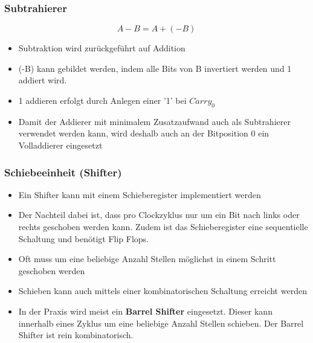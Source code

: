 \subsubsection{Subtrahierer}
\begin{equation}
A-B = A + (-B)
\end{equation}
\begin{itemize}
	\item Subtraktion wird zurückgeführt auf Addition
	\item (-B) kann gebildet werden, indem alle Bits von B invertiert werden und 1 addiert wird.
	\item 1 addieren erfolgt durch Anlegen einer '1' bei $Carry_0$
	\item Damit der Addierer mit minimalem Zusatzaufwand auch als Subtrahierer verwendet werden kann, wird deshalb auch an der Bitposition 0 ein Volladdierer eingesetzt
\end{itemize}

\subsubsection{Schiebeeinheit (Shifter)}
\begin{itemize}
	\item Ein Shifter kann mit einem Schieberegister implementiert werden
	\item Der Nachteil dabei ist, dass pro Clockzyklus nur um ein Bit nach links oder rechts geschoben werden kann. Zudem ist das Schieberegister eine sequentielle Schaltung und benötigt Flip Flops.
	\item Oft muss um eine beliebige Anzahl Stellen möglichst  in einem Schritt geschoben werden
	\item Schieben kann auch mittels einer kombinatorischen Schaltung erreicht werden
	\item In der Praxis wird meist ein \textbf{Barrel Shifter} eingesetzt. Dieser kann innerhalb eines Zyklus um eine beliebige Anzahl Stellen schieben. Der Barrel Shifter ist rein kombinatorisch.
\end{itemize}

